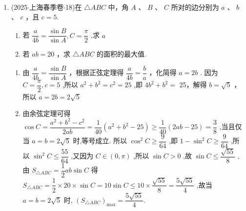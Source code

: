 \begin{enumerate}
    \item (2025$\cdot$上海春季卷$\cdot$18)在 $\bigtriangleup  {ABC}$ 中，角 $A$ 、 $B$ 、 $C$ 所对的边分别为 $a$ 、 $b$ 、 $c$ ，且 $c = 5$.
    \begin{enumerate}
        \item 若 $\dfrac{a}{4b} = \dfrac{\sin B}{\sin A},C = \dfrac{\pi }{2}$ ,求 $a$
        \item 若 ${ab} = {20}$ ，求 $\bigtriangleup  {ABC}$ 的面积的最大值.
    \end{enumerate}
    \begin{jieda}
        \begin{enumerate}
            \item 由 $\dfrac{a}{4b} = \dfrac{\sin B}{\sin A}$ ，根据正弦定理得 $\dfrac{a}{4b} = \dfrac{b}{a}$ ，化简得 $a =  {2b}$ . 因为 $C = \dfrac{\pi }{2},c = 5$ ,所以 ${a}^{2} + {b}^{2} = {c}^{2} = {25}$ ,即 $4{b}^{2} + {b}^{2} =$ 25，解得 $b = \sqrt{5}$ ，所以 $a = {2b} = {2\sqrt{5}}$
            \item 由余弦定理可得 $\cos C = \dfrac{{a}^{2} + {b}^{2} - {c}^{2}}{2ab} = \dfrac{1}{40}\left( {{a}^{2} + {b}^{2} - {25}}\right)  \geq  \dfrac{1}{40}\left( {{2ab} - {25}}\right)  = \dfrac{3}{8}$ ,当且仅当 $a = b = 2\sqrt{5}$ 时,等号成立. 所以 ${\cos }^{2}C \geq  \dfrac{9}{64}$ ,即 $1 - {\sin }^{2}C \geq  \dfrac{9}{64}$ ,所以 ${\sin }^{2}C \leq  \dfrac{55}{64}$ ,又因为 $C \in  \left( {0,\pi }\right)$ ,所以 $\sin C > 0$ ,故 $\sin C \leq  \dfrac{\sqrt{55}}{8}$ ,由 ${S}_{\bigtriangleup {ABC}} =  \dfrac{1}{2}{ab}\sin C$ 得 ${S}_{\bigtriangleup {ABC}} = \dfrac{1}{2} \times  {20} \times  \sin C = {10}\sin C \leq  {10} \times  \dfrac{\sqrt{55}}{8} =  \dfrac{5\sqrt{55}}{4}$ ,故当 $a = b = 2\sqrt{5}$ 时, ${\left( {S}_{\bigtriangleup {ABC}}\right) }_{\max } = \dfrac{5\sqrt{55}}{4}$.
        \end{enumerate}
    \end{jieda}
    

\end{enumerate}
